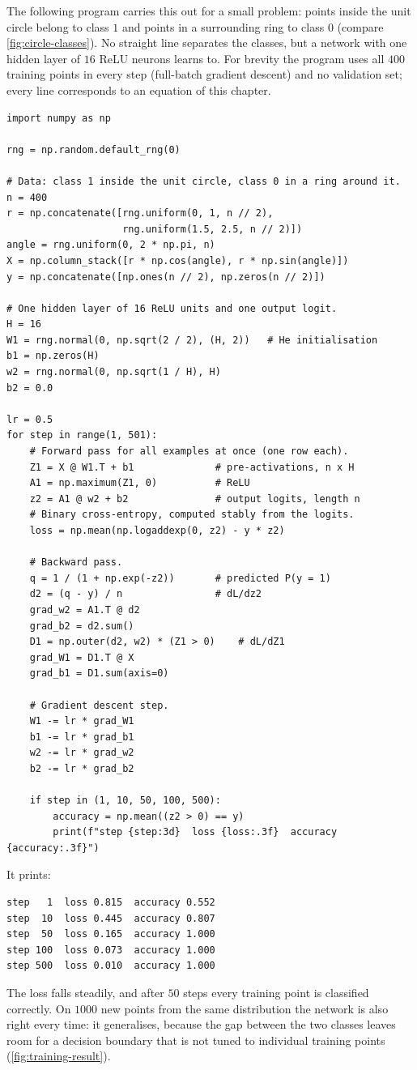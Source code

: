 The following program carries this out for a small problem: points inside the
unit circle belong to class $1$ and points in a surrounding ring to class $0$
(compare \cref{fig:circle-classes}). No straight line separates the classes, but a
network with one hidden layer of $16$ ReLU neurons learns to. For brevity the
program uses all $400$ training points in every step (full-batch gradient
descent) and no validation set; every line corresponds to an equation of this
chapter.
\begin{lstlisting}
import numpy as np

rng = np.random.default_rng(0)

# Data: class 1 inside the unit circle, class 0 in a ring around it.
n = 400
r = np.concatenate([rng.uniform(0, 1, n // 2),
                    rng.uniform(1.5, 2.5, n // 2)])
angle = rng.uniform(0, 2 * np.pi, n)
X = np.column_stack([r * np.cos(angle), r * np.sin(angle)])
y = np.concatenate([np.ones(n // 2), np.zeros(n // 2)])

# One hidden layer of 16 ReLU units and one output logit.
H = 16
W1 = rng.normal(0, np.sqrt(2 / 2), (H, 2))   # He initialisation
b1 = np.zeros(H)
w2 = rng.normal(0, np.sqrt(1 / H), H)
b2 = 0.0

lr = 0.5
for step in range(1, 501):
    # Forward pass for all examples at once (one row each).
    Z1 = X @ W1.T + b1              # pre-activations, n x H
    A1 = np.maximum(Z1, 0)          # ReLU
    z2 = A1 @ w2 + b2               # output logits, length n
    # Binary cross-entropy, computed stably from the logits.
    loss = np.mean(np.logaddexp(0, z2) - y * z2)

    # Backward pass.
    q = 1 / (1 + np.exp(-z2))       # predicted P(y = 1)
    d2 = (q - y) / n                # dL/dz2
    grad_w2 = A1.T @ d2
    grad_b2 = d2.sum()
    D1 = np.outer(d2, w2) * (Z1 > 0)    # dL/dZ1
    grad_W1 = D1.T @ X
    grad_b1 = D1.sum(axis=0)

    # Gradient descent step.
    W1 -= lr * grad_W1
    b1 -= lr * grad_b1
    w2 -= lr * grad_w2
    b2 -= lr * grad_b2

    if step in (1, 10, 50, 100, 500):
        accuracy = np.mean((z2 > 0) == y)
        print(f"step {step:3d}  loss {loss:.3f}  accuracy {accuracy:.3f}")
\end{lstlisting}
It prints:
\par\noindent\begin{minipage}{\linewidth}
\begin{lstlisting}[language={},keywordstyle=\color{black}]
step   1  loss 0.815  accuracy 0.552
step  10  loss 0.445  accuracy 0.807
step  50  loss 0.165  accuracy 1.000
step 100  loss 0.073  accuracy 1.000
step 500  loss 0.010  accuracy 1.000
\end{lstlisting}
\end{minipage}\par
The loss falls steadily, and after $50$ steps every training point is classified
correctly. On $1000$ new points from the same distribution the network is also
right every time: it generalises, because the gap between the two classes leaves
room for a decision boundary that is not tuned to individual training points
(\cref{fig:training-result}).

